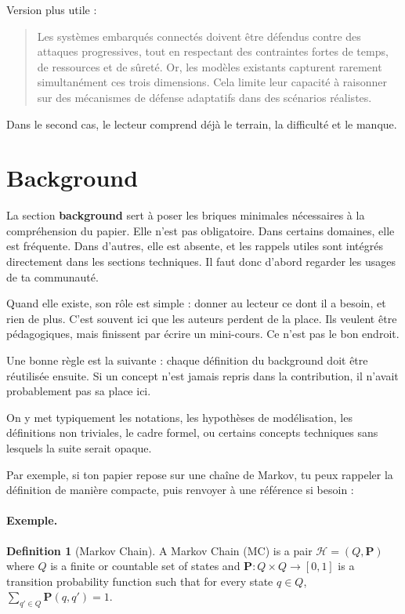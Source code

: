 \documentclass[11pt,a4paper]{article}
\theoremstyle{definition}
\newtheorem{definition}{Definition}
\begin{document}
Version plus utile :
\begin{quote}
Les systèmes embarqués connectés doivent être défendus contre des attaques progressives, tout en respectant des contraintes fortes de temps, de ressources et de sûreté. Or, les modèles existants capturent rarement simultanément ces trois dimensions. Cela limite leur capacité à raisonner sur des mécanismes de défense adaptatifs dans des scénarios réalistes.
\end{quote}

Dans le second cas, le lecteur comprend déjà le terrain, la difficulté et le manque.


\section{Background}

La section \textbf{background} sert à poser les briques minimales nécessaires à la compréhension du papier. Elle n'est pas obligatoire. Dans certains domaines, elle est fréquente. Dans d'autres, elle est absente, et les rappels utiles sont intégrés directement dans les sections techniques. Il faut donc d'abord regarder les usages de ta communauté.

Quand elle existe, son rôle est simple : donner au lecteur ce dont il a besoin, et rien de plus. C'est souvent ici que les auteurs perdent de la place. Ils veulent être pédagogiques, mais finissent par écrire un mini-cours. Ce n'est pas le bon endroit.

Une bonne règle est la suivante : chaque définition du background doit être réutilisée ensuite. Si un concept n'est jamais repris dans la contribution, il n'avait probablement pas sa place ici.

On y met typiquement les notations, les hypothèses de modélisation, les définitions non triviales, le cadre formel, ou certains concepts techniques sans lesquels la suite serait opaque.

Par exemple, si ton papier repose sur une chaîne de Markov, tu peux rappeler la définition de manière compacte, puis renvoyer à une référence si besoin :

\paragraph{Exemple.}
\begin{definition}[Markov Chain]
A Markov Chain (MC) is a pair $\mathcal{H}=(Q,\mathbf{P})$ where $Q$ is a finite or countable set of states and $\mathbf{P}: Q \times Q \rightarrow [0,1]$ is a transition probability function such that for every state $q \in Q$, $\sum_{q' \in Q}\mathbf{P}(q,q')=1$.
\end{definition}
\end{document}
